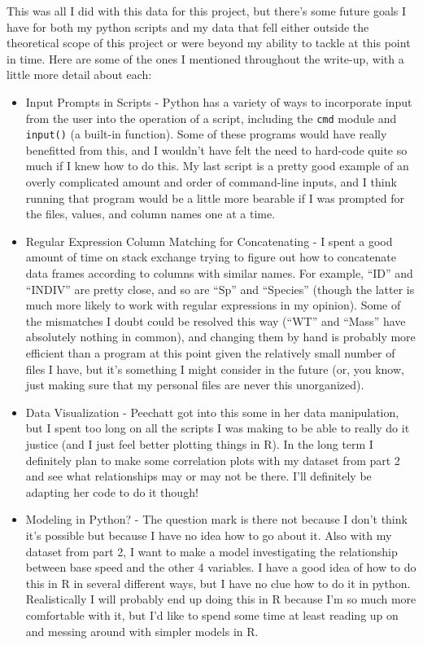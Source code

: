 \documentclass[
]{article}
\providecommand{\tightlist}{%
  \setlength{\itemsep}{0pt}\setlength{\parskip}{0pt}}
\begin{document}
This was all I did with this data for this project, but there's some
future goals I have for both my python scripts and my data that fell
either outside the theoretical scope of this project or were beyond my
ability to tackle at this point in time. Here are some of the ones I
mentioned throughout the write-up, with a little more detail about each:

\begin{itemize}
\tightlist
\item
  Input Prompts in Scripts - Python has a variety of ways to incorporate
  input from the user into the operation of a script, including the
  \texttt{cmd} module and \texttt{input()} (a built-in function). Some
  of these programs would have really benefitted from this, and I
  wouldn't have felt the need to hard-code quite so much if I knew how
  to do this. My last script is a pretty good example of an overly
  complicated amount and order of command-line inputs, and I think
  running that program would be a little more bearable if I was prompted
  for the files, values, and column names one at a time.
\item
  Regular Expression Column Matching for Concatenating - I spent a good
  amount of time on stack exchange trying to figure out how to
  concatenate data frames according to columns with similar names. For
  example, ``ID'' and ``INDIV'' are pretty close, and so are ``Sp'' and
  ``Species'' (though the latter is much more likely to work with
  regular expressions in my opinion). Some of the mismatches I doubt
  could be resolved this way (``WT'' and ``Mass'' have absolutely
  nothing in common), and changing them by hand is probably more
  efficient than a program at this point given the relatively small
  number of files I have, but it's something I might consider in the
  future (or, you know, just making sure that my personal files are
  never this unorganized).
\item
  Data Visualization - Peechatt got into this some in her data
  manipulation, but I spent too long on all the scripts I was making to
  be able to really do it justice (and I just feel better plotting
  things in R). In the long term I definitely plan to make some
  correlation plots with my dataset from part 2 and see what
  relationships may or may not be there. I'll definitely be adapting her
  code to do it though!
\item
  Modeling in Python? - The question mark is there not because I don't
  think it's possible but because I have no idea how to go about it.
  Also with my dataset from part 2, I want to make a model investigating
  the relationship between base speed and the other 4 variables. I have
  a good idea of how to do this in R in several different ways, but I
  have no clue how to do it in python. Realistically I will probably end
  up doing this in R because I'm so much more comfortable with it, but
  I'd like to spend some time at least reading up on and messing around
  with simpler models in R.
\end{itemize}
\end{document}
